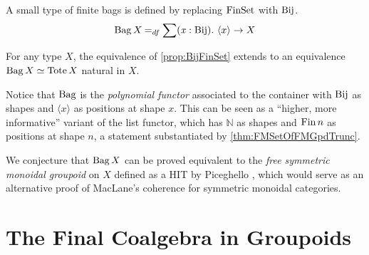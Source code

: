 \documentclass[final,a4paper,USenglish,cleveref]{lipics-v2021}
\begin{document}
  A small type of finite bags %
  is defined by replacing $\Op{FinSet}$ with $\Bij$.
  \begin{align*}
    \Bag X
      \DefEq
      \sum (\Var{x} : \Bij) \Where
        \langle x \rangle \to X
  \end{align*}
  \begin{proposition}\label{prop:BagTote}
    For any type $X$, the equivalence of \cref{prop:BijFinSet} extends to an equivalence $\Bag X \simeq \Tote X$ natural in $X$.
  \end{proposition}
 Notice that $\Bag$ is the \emph{polynomial functor} associated to the container with $\Bij$ as shapes and $\langle x \rangle$ as positions at shape $x$. This can be seen as a \enquote{higher, more informative} variant of the list functor, which has $ℕ$ as shapes and $\Fin n$ as positions at shape $n$, a statement substantiated by \cref{thm:FMSetOfFMGpdTrunc}.

We conjecture that $\Bag X$ can be proved equivalent to the \emph{free symmetric monoidal groupoid} on $X$ defined as a HIT by Piceghello \cite{Piceghello2021}, which would serve as an alternative proof of MacLane's coherence for symmetric monoidal categories.


\section{The Final Coalgebra in Groupoids}\label{sec:final-coalgebra-groupoids}


\end{document}
